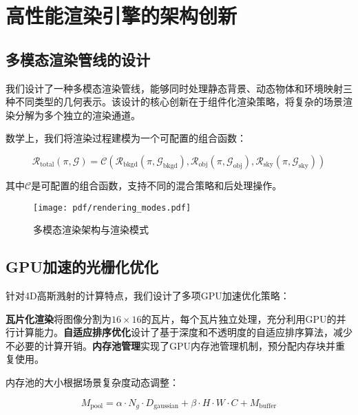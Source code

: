\section{高性能渲染引擎的架构创新}

\subsection{多模态渲染管线的设计}

我们设计了一种多模态渲染管线，能够同时处理静态背景、动态物体和环境映射三种不同类型的几何表示。该设计的核心创新在于组件化渲染策略，将复杂的场景渲染分解为多个独立的渲染通道。

数学上，我们将渲染过程建模为一个可配置的组合函数：

\begin{equation}
\mathcal{R}_{\text{total}}(\pi, \mathcal{G}) = \mathcal{C}(\mathcal{R}_{\text{bkgd}}(\pi, \mathcal{G}_{\text{bkgd}}), \mathcal{R}_{\text{obj}}(\pi, \mathcal{G}_{\text{obj}}), \mathcal{R}_{\text{sky}}(\pi, \mathcal{G}_{\text{sky}}))
\label{eq:modular_rendering}
\end{equation}

其中$\mathcal{C}$是可配置的组合函数，支持不同的混合策略和后处理操作。

\begin{figure}[htbp]
  \centering
  \texttt{[image: pdf/rendering\_modes.pdf]}
  \caption{多模态渲染架构与渲染模式}
  \label{fig:rendering-modes}
\end{figure}

\subsection{GPU加速的光栅化优化}

针对4D高斯溅射的计算特点，我们设计了多项GPU加速优化策略：

\textbf{瓦片化渲染}将图像分割为$16 \times 16$的瓦片，每个瓦片独立处理，充分利用GPU的并行计算能力。\textbf{自适应排序优化}设计了基于深度和不透明度的自适应排序算法，减少不必要的计算开销。\textbf{内存池管理}实现了GPU内存池管理机制，预分配内存块并重复使用。

内存池的大小根据场景复杂度动态调整：

\begin{equation}
M_{\text{pool}} = \alpha \cdot N_g \cdot D_{\text{gaussian}} + \beta \cdot H \cdot W \cdot C + M_{\text{buffer}}
\label{eq:memory_pool_sizing}
\end{equation}

